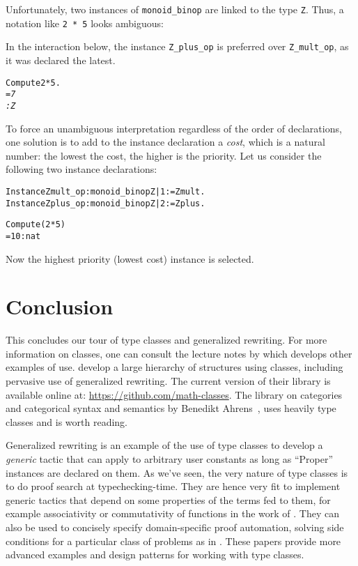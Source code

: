 \documentclass[a4]{report}
\begin{document}
Unfortunately, two instances of \texttt{monoid\_binop} are linked to the type 
\texttt{Z}. Thus, a notation like \texttt{2 * 5} looks ambiguous: 

In the interaction below, the instance \texttt{Z\_plus\_op} is preferred
over \texttt{Z\_mult\_op}, as it was declared the latest.
\begin{alltt}
Compute 2 * 5.\it
     = 7
     : Z
\end{alltt}

To force an unambiguous interpretation regardless of the order of
declarations, one solution is to add to the instance declaration a
\emph{cost}, which is a natural number: the lowest the cost, the
higher is the priority.  Let us consider the following two instance
declarations:

\begin{alltt}
Instance Zmult_op : monoid_binop Z | 1 := Zmult.
Instance Zplus_op : monoid_binop Z | 2 := Zplus.

Compute (2 * 5)%M.\it\color{red}
= 10 : nat
\end{alltt}

Now the highest priority (lowest cost) instance is selected.





\chapter*{Conclusion}

This concludes our tour of type classes and generalized rewriting. For
more information on classes, one can consult the lecture notes by \citet
{sozeau.Coq/classes/JFLA12} which develops other examples of
use. \citet{math-classes} develop a large hierarchy of structures
using classes, including pervasive use of generalized rewriting. 
The current version of their library is available online at:
\url{https://github.com/math-classes}. 
The library on categories and categorical syntax and semantics by
Benedikt Ahrens~\cite{Ahrens}, uses heavily type classes and is worth reading.


Generalized rewriting \citep{sozeauJFR09} is an example of the use of
type classes to develop a \emph{generic} tactic that can apply to
arbitrary user constants as long as ``Proper'' instances are declared on
them. As we've seen, the very nature of type classes is to do proof
search at typechecking-time. They are hence very fit to implement
generic tactics that depend on some properties of the terms fed to them,
for example associativity or commutativity of functions in the work of
\citet{DBLP:journals/corr/abs-1105-4537}.
They can also be used to concisely specify domain-specific proof
automation, solving side conditions for a particular class of problems
as in \cite{DBLP:conf/icfp/GonthierZND11}. These papers provide more
advanced examples and design patterns for working with type classes.



\end{document}
